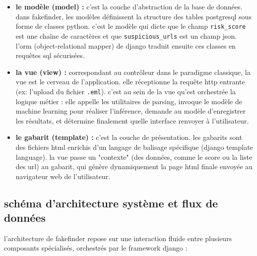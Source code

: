 \documentclass[12pt,a4paper]{report}
\begin{document}
\begin{itemize}
    \item \textbf{le modèle (model) :} c'est la couche d'abstraction de la base de données. dans fakefinder, les modèles définissent la structure des tables postgresql sous forme de classes python. c'est le modèle qui dicte que le champ \texttt{risk\_score} est une chaîne de caractères et que \texttt{suspicious\_urls} est un champ json. l'orm (object-relational mapper) de django traduit ensuite ces classes en requêtes sql sécurisées.
    
    \item \textbf{la vue (view) :} correspondant au contrôleur dans le paradigme classique, la vue est le cerveau de l'application. elle réceptionne la requête http entrante (ex: l'upload du fichier \texttt{.eml}). c'est au sein de la vue qu'est orchestrée la logique métier : elle appelle les utilitaires de parsing, invoque le modèle de machine learning pour réaliser l'inférence, demande au modèle d'enregistrer les résultats, et détermine finalement quelle interface renvoyer à l'utilisateur.
    
    \item \textbf{le gabarit (template) :} c'est la couche de présentation. les gabarits sont des fichiers html enrichis d'un langage de balisage spécifique (django template language). la vue passe un "contexte" (des données, comme le score ou la liste des url) au gabarit, qui génère dynamiquement la page html finale envoyée au navigateur web de l'utilisateur.
\end{itemize}

\subsection{schéma d'architecture système et flux de données}
l'architecture de fakefinder repose sur une interaction fluide entre plusieurs composants spécialisés, orchestrés par le framework django :
\end{document}
